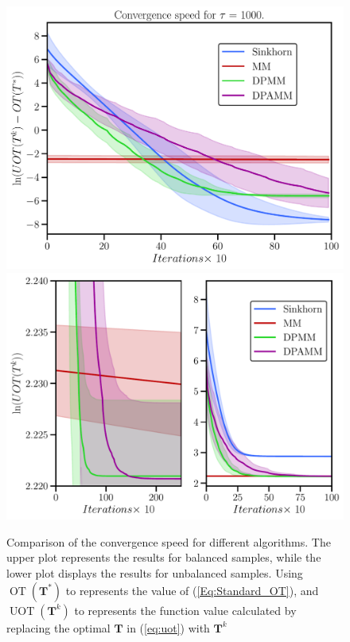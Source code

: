 \documentclass[conference]{IEEEtran}
\newcommand{\mat}[1]{\mathbf{#1}}
\begin{document}
\begin{figure}[t]
\centering
\includegraphics[width = 0.99\linewidth]{pic/ex1}
\centering
\includegraphics[width = 0.99\linewidth]{pic/ex3}
\caption{Comparison of the convergence speed for different algorithms. The upper plot represents the results for balanced samples, while the lower plot displays the results for unbalanced samples. Using $\operatorname{OT}(\mat T^{*})$ to represents the value of {(\ref{Eq:Standard_OT})}, and $\operatorname{UOT}(\mat T^{k})$ to represents the function value calculated by replacing the optimal $\mat T$ in {(\ref{eq:uot})} with $\mat T^{k}$ }
\label{Fig:ex1}
\end{figure}
\end{document}
